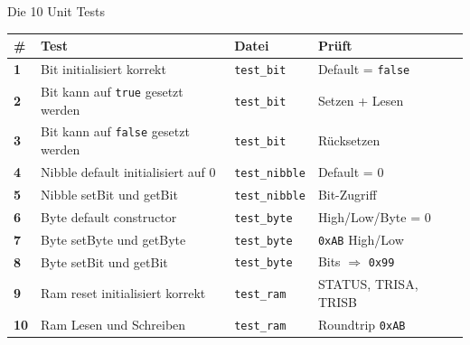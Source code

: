 \documentclass[10pt]{beamer}
\begin{document}
\begin{frame}{Die 10 Unit Tests}
    \small
    \begin{tabular}{>{\bfseries}p{0.4cm} p{3.8cm} p{2.2cm} p{2.8cm}}
        \toprule
        \# & Test & Datei & Prüft \\
        \midrule
        1 & Bit initialisiert korrekt & \texttt{test\_bit} & Default = \texttt{false} \\
        2 & Bit kann auf \texttt{true} gesetzt werden & \texttt{test\_bit} & Setzen + Lesen \\
        3 & Bit kann auf \texttt{false} gesetzt werden & \texttt{test\_bit} & Rücksetzen \\
        4 & Nibble default initialisiert auf 0 & \texttt{test\_nibble} & Default = 0 \\
        5 & Nibble setBit und getBit & \texttt{test\_nibble} & Bit-Zugriff \\
        6 & Byte default constructor & \texttt{test\_byte} & High/Low/Byte = 0 \\
        7 & Byte setByte und getByte & \texttt{test\_byte} & \texttt{0xAB} High/Low \\
        8 & Byte setBit und getBit & \texttt{test\_byte} & Bits $\Rightarrow$ \texttt{0x99} \\
        9 & Ram reset initialisiert korrekt & \texttt{test\_ram} & STATUS, TRISA, TRISB \\
        10 & Ram Lesen und Schreiben & \texttt{test\_ram} & Roundtrip \texttt{0xAB} \\
        \bottomrule
    \end{tabular}
\end{frame}
\end{document}
